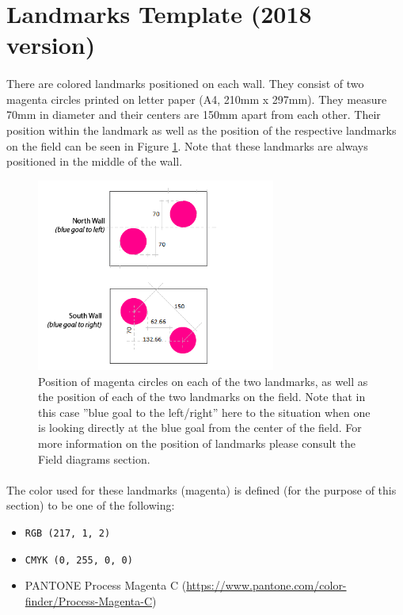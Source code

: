 \documentclass{article}
\newcommand*{\p}{\paragraph{}}
\begin{document}
\newpage
\section{Landmarks Template (2018 version)\label{landmarks}}

\p There are colored landmarks positioned on each wall. They consist
of two magenta circles printed on letter paper (A4, 210mm x 297mm). They
measure 70mm in diameter and their centers are 150mm apart from each other.
Their position within the landmark as well as the position of the
respective landmarks on the field can be seen in Figure
\ref{fig:landmarks_blueprint}. Note that these landmarks are always positioned
in the middle of the wall.

\begin{figure}[H]
    \centering
    \includegraphics[width=0.7\textwidth]{media/landmarks_blueprint.png}
    \caption{Position of magenta circles on each of the two landmarks, as well
        as the position of each of the two landmarks on the field. Note that in
        this case ''blue goal to the left/right'' here to the situation when
        one is looking directly at the blue goal from the center of the field.
        For more information on the position of landmarks please consult the
        Field diagrams section.}
    \label{fig:landmarks_blueprint}
\end{figure}

\p The color used for these landmarks (magenta) is defined (for the purpose of
this section) to be one of the following:

\begin{itemize}
    \item \texttt{RGB (217, 1, 2)}
    \item \texttt{CMYK (0, 255, 0, 0)}
    \item PANTONE Process Magenta C (\url{https://www.pantone.com/color-finder/Process-Magenta-C})
\end{itemize}
\end{document}
